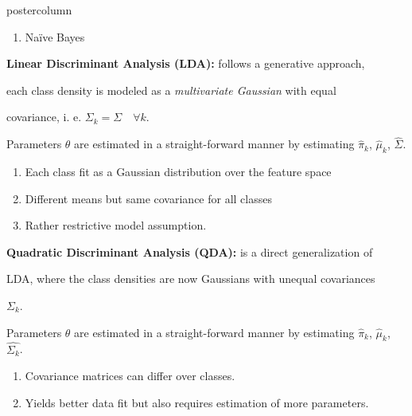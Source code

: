 \documentclass{beamer}
\begin{document}
\begin{frame}[fragile]{}
\begin{columns}
\begin{column}{.31\textwidth}
\begin{beamercolorbox}[center]{postercolumn}
\begin{minipage}{.98\textwidth}
{\begin{myblock}{}
\begin{enumerate}
                        \item Naïve Bayes
                        \end{enumerate}
						\hspace*{1ex}
						\begin{codebox}
							 \textbf{Linear Discriminant Analysis (LDA): }follows a generative approach,
						\end{codebox}
						\begin{codebox}
							  each class density is modeled as a \emph{multivariate Gaussian} with equal
						\end{codebox}
						\begin{codebox}
							  covariance, i. e. $\Sigma_k = \Sigma \quad \forall k$.
						\end{codebox}
						\hspace*{1ex}Parameters $\theta$ are estimated in a straight-forward manner by estimating \hspace*{1ex}$\hat{\pi}_k$, $\hat{\mu}_k$, $\hat{\Sigma}$.
						\begin{enumerate}
                        \item Each class fit as a Gaussian distribution over the feature space
                        \item Different means but same covariance for all classes
                        \item Rather restrictive model assumption.
                        \end{enumerate}
                        \hspace*{1ex}
						\begin{codebox}
							 \textbf{Quadratic Discriminant Analysis (QDA): }is a direct generalization of
						\end{codebox}
						\begin{codebox}
							  LDA, where the class densities are now Gaussians with unequal covariances
						\end{codebox}
						\begin{codebox}
							  $\Sigma_k$.
						\end{codebox}
						\hspace*{1ex}Parameters $\theta$ are estimated in a straight-forward manner by estimating \hspace*{1ex}$\hat{\pi}_k$, $\hat{\mu}_k$, $\hat{\Sigma_k}$.
						\begin{enumerate}
                        \item Covariance matrices can differ over classes.
                        \item Yields better data fit but also requires estimation of more parameters.
                        \end{enumerate}
                        \hspace*{1ex}
                        

\end{myblock}}
\end{minipage}
\end{beamercolorbox}
\end{column}
\end{columns}
\end{frame}
\end{document}
